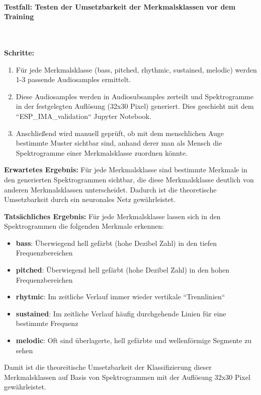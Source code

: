 \paragraph{Testfall: Testen der Umsetzbarkeit der Merkmalsklassen vor dem Training}\mbox{}\\
\begin{adjustwidth}{0.5cm}{0cm}
\textbf{Schritte:}

\begin{enumerate}
	\item Für jede Merkmalsklasse (bass, pitched, rhythmic, sustained, melodic) werden 1-3 passende Audiosamples ermittelt.
	\item Diese Audiosamples werden in Audiosubsamples zerteilt und Spektrogramme in der festgelegten Auflösung (32x30 Pixel) generiert. Dies geschieht mit dem ``ESP\_IMA\_validation`` Jupyter Notebook.
	\item Anschließend wird manuell geprüft, ob mit dem menschlichen Auge bestimmte Muster sichtbar sind, anhand derer man als Mensch die Spektrogramme einer Merkmalsklasse zuordnen könnte.
\end{enumerate}

\textbf{Erwartetes Ergebnis:} 
Für jede Merkmalsklasse sind bestimmte Merkmale in den generierten Spektrogrammen sichtbar, die diese Merkmalsklasse deutlich von anderen Merkmalsklassen unterscheidet. Dadurch ist die theoretische Umsetzbarkeit durch ein neuronales Netz gewährleistet.

\textbf{Tatsächliches Ergebnis:} Für jede Merkmalsklasse lassen sich in den Spektrogrammen die folgenden Merkmale erkennen:

\begin{itemize}
  \item \textbf{bass}: Überwiegend hell gefärbt (hohe Dezibel Zahl) in den tiefen Frequenzbereichen
  \item \textbf{pitched}: Überwiegend hell gefärbt (hohe Dezibel Zahl) in den hohen Frequenzbereichen
  \item \textbf{rhytmic}: Im zeitliche Verlauf immer wieder vertikale ``Trennlinien``
  \item \textbf{sustained}: Im zeitliche Verlauf häufig durchgehende Linien für eine bestimmte Frequenz
  \item \textbf{melodic}: Oft sind überlagerte, hell gefärbte und wellenförmige Segmente zu sehen
\end{itemize}

Damit ist die theoreitische Umsetzbarkeit der Klassifizierung dieser Merkmalsklassen auf Basis von Spektrogrammen mit der Auflösung 32x30 Pixel gewährleistet.

\end{adjustwidth}